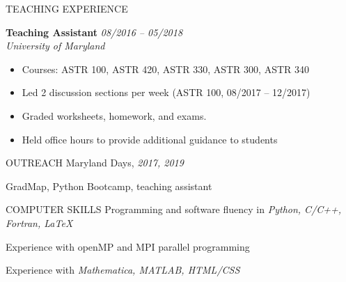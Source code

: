 \documentclass[letterpaper]{resume} %
\begin{document}
\begin{rSection}{TEACHING EXPERIENCE} \itemsep -3pt
\renewcommand\labelitemi{\tiny$\bullet$}

{\bf Teaching Assistant} \hfill {\em 08/2016 -- 05/2018}\\
  \emph{University of Maryland}
  \begin{itemize}[noitemsep,topsep=-2pt]
  \item Courses: ASTR 100, ASTR 420, ASTR 330, ASTR 300, ASTR 340
  \item Led 2 discussion sections per week (ASTR 100, 08/2017 -- 12/2017) 
  \item Graded worksheets, homework, and exams.
  \item Held office hours to provide additional guidance to students
  \end{itemize}
\end{rSection}

\begin{rSection}{OUTREACH}
  Maryland Days, {\it 2017, 2019}
\item GradMap, Python Bootcamp, teaching assistant 
\end{rSection}

\begin{rSection}{COMPUTER SKILLS}
Programming and software fluency in {\em Python, C/C++, Fortran, \LaTeX}
\item Experience with openMP and MPI parallel programming
\item Experience with {\em Mathematica, MATLAB, HTML/CSS}
\end{rSection}
\end{document}
